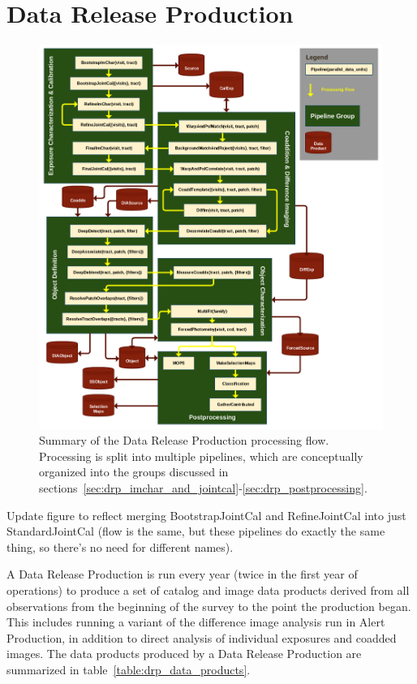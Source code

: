 \section{Data Release Production}
\label{sec:drp}

\begin{figure}
\centering
\includegraphics[width=\textwidth]{figures/drp_summary.png}
\caption{Summary of the Data Release Production processing flow.  Processing is split into multiple pipelines, which are conceptually organized into the groups discussed in sections~\ref{sec:drp_imchar_and_jointcal}-\ref{sec:drp_postprocessing}.
\label{fig:drp_summary}}
\end{figure}

\begin{note}[TODO]
  Update figure to reflect merging BootstrapJointCal and RefineJointCal into just StandardJointCal (flow is the same, but these pipelines do exactly the same thing, so there's no need for different names).
\end{note}

A Data Release Production is run every year (twice in the first year of operations) to produce a set of catalog and image data products derived from all observations from the beginning of the survey to the point the production began.  This includes running a variant of the difference image analysis run in Alert Production, in addition to direct analysis of individual exposures and coadded images.  The data products produced by a Data Release Production are summarized in table~\ref{table:drp_data_products}.


